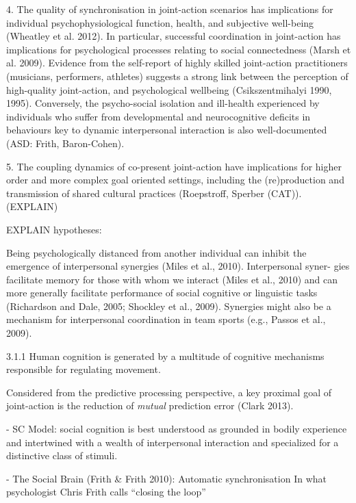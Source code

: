     4. The quality of synchronisation in joint-action scenarios has implications for individual psychophysiological function, health, and subjective well-being (Wheatley et al. 2012).  In particular, successful coordination in joint-action has implications for psychological processes relating to social connectedness (Marsh et al. 2009).  Evidence from the self-report of highly skilled joint-action practitioners (musicians, performers, athletes) suggests a strong link between the perception of high-quality joint-action, and psychological wellbeing (Csikszentmihalyi 1990, 1995).  Conversely, the psycho-social isolation and ill-health experienced by individuals who suffer from developmental and neurocognitive deficits in behaviours key to dynamic interpersonal interaction is also well-documented (ASD: Frith, Baron-Cohen).

    5. The coupling dynamics of co-present joint-action have implications for higher order and more complex goal oriented settings, including the (re)production and transmission of shared cultural practices (Roepstroff, Sperber (CAT)).  (EXPLAIN)


EXPLAIN hypotheses:





Being psychologically distanced from another individual can inhibit the emergence of interpersonal synergies (Miles et al., 2010). Interpersonal syner- gies facilitate memory for those with whom we interact (Miles et al., 2010) and can more generally facilitate performance of social cognitive or linguistic tasks (Richardson and Dale, 2005; Shockley et al., 2009). Synergies might also be a mechanism for interpersonal coordination in team sports (e.g., Passos et al., 2009).









3.1.1 Human cognition is generated by a multitude of cognitive mechanisms responsible for regulating movement.

Considered from the predictive processing perspective, a key proximal goal of joint-action is the reduction of \textit{mutual} prediction error (Clark 2013).


- SC Model:
social cognition is best understood as grounded in bodily experience and intertwined with a wealth of interpersonal interaction and specialized for a distinctive class of stimuli.

- The Social Brain (Frith & Frith 2010):
Automatic synchronisation
In what psychologist Chris Frith calls ``closing the loop''









